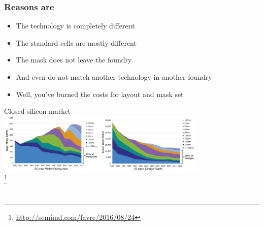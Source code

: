 \documentclass{beamer}
\begin{document}
\begin{frame}
\frametitle{Reasons are}
	\begin{itemize}
		\item The technology is completely different
		\item The standard cells are mostly different
		\item The mask does not leave the foundry
		\item And even do not match another technology in another foundry
		\item Well, you've burned the costs for layout and mask set
	\end{itemize}
\end{frame}

\begin{frame}{Closed silicon market}
	\centering
	\hspace*{-0.3in}
	\includegraphics[width=0.75\textwidth]{market-closing.png} \\
	\footnote{\url{http://semimd.com/favre/2016/08/24}}
\end{frame}



\section[How]{}
\end{document}
